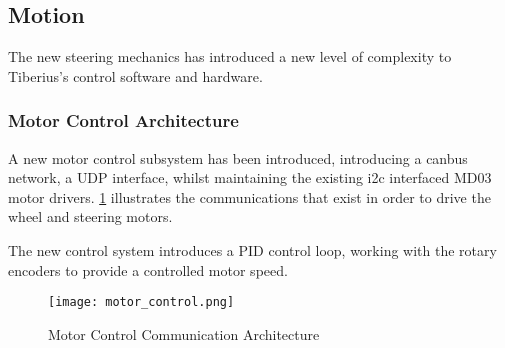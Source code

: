 \subsection{Motion}

The new steering mechanics has introduced a new level of complexity to Tiberius's control software and hardware. 



\subsubsection{Motor Control Architecture}
A new motor control subsystem has been introduced, introducing a \gls{canbus} network, a \gls{UDP} interface, whilst maintaining the existing \gls{i2c} interfaced MD03 motor drivers. \ref{fig:motor-control-architecture} illustrates the communications that exist in order to drive the wheel and steering motors.

The new control system introduces a PID control loop, working with the rotary encoders to provide a controlled motor speed.

\begin{figure}[!htb]
\begin{center}
\texttt{[image: motor\_control.png]}
\end{center}
\caption{Motor Control Communication Architecture}
\label{fig:motor-control-architecture}
\end{figure}